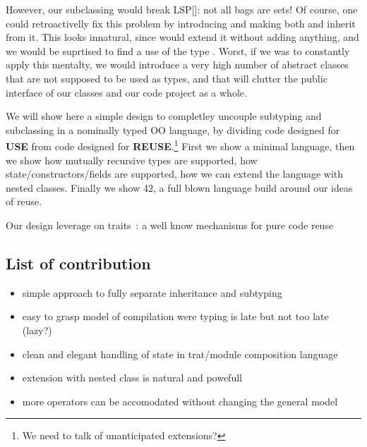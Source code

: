 However, our subclassing would break LSP[]: not all bags are sets!
Of course, one could retroactivelly fix this problem by introducing \Q@AbstractSetOrBag@
and making both \Q@Bag@ and \Q@Set@ inherit from it.
This looks innatural, since \Q@Set@ would extend it without adding anything,
and we would be suprtised to find a use of the type \Q@AbstractSetOrBag@.
Worst, if we was to constantly apply this mentalty, we would introduce a very high number
of abstract classes that are not supposed to be used as types, and that will clutter the 
public interface of our classes and our code project as a whole.

We will show here a simple design to completley uncouple subtyping
and subclassing in a nominally typed OO language,
by dividing code designed for \textbf{USE}
from code designed for \textbf{REUSE}.\footnote{We need to talk of unanticipated extensions?}
First we show a minimal language, then we show how mutually recursive types
are supported, how state/constructors/fields are supported,
how we can extend the language with nested classes.
Finally we show 42, a full blown language build around our ideas of reuse.

Our design leverage on traits~\cite{}: a well know mechanisms for pure
code reuse


\subsection{List of contribution}
\begin{itemize}
\item simple approach to fully separate inheritance and subtyping
\item easy to grasp model of compilation were typing is late but not too late (lazy?)
\item clean and elegant handling of state in trat/module composition language
\item extension with nested class is natural and powefull
\item more operators can be accomodated without changing the general model
\end{itemize}
